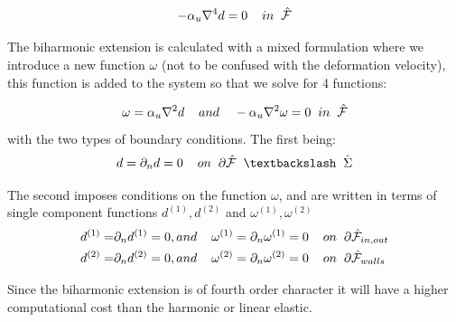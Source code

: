 \begin{equation}
- \alpha_u \nabla^4 d = 0 \hspace{4mm}  in \hspace{2mm} \hat{\mathcal{F}}\\
\end{equation}

The biharmonic extension is calculated with a mixed formulation where we introduce a new function $\omega$ (not to be confused with the deformation velocity), this function is added to the system so that we solve for 4 functions:

\begin{equation}
\omega = \alpha_u \nabla^2 d \hspace{4mm} and \hspace{4mm} - \alpha_u \nabla^2 \omega = 0 \hspace{2mm}   in \hspace{2mm} \hat{\mathcal{F}}
\end{equation}
with the two types of boundary conditions. The first being:
\begin{equation}
d = \partial_n d = 0 \hspace{4mm} on \hspace{2mm} \partial \hat{\mathcal{F}} \hspace{2mm} \textbackslash \hspace{2mm} \hat{\Sigma}
\end{equation}

The second imposes conditions on the function $\omega$, and are written in terms of single component functions $d^{(1)},d^{(2)}$ and $\omega^{(1)}, \omega^{(2)}$	
\begin{align}
d^{(1)} =& \partial_n d^{(1)} = 0 , and \hspace{4mm}   \omega^{(1)} = \partial_n \omega^{(1)} = 0    \hspace{4mm} on \hspace{2mm} \partial \hat{\mathcal{F}}_{in,out} \\
d^{(2)} =& \partial_n d^{(2)} = 0 , and \hspace{4mm}   \omega^{(2)} = \partial_n \omega^{(2)} = 0    \hspace{4mm} on \hspace{2mm} \partial \hat{\mathcal{F}}_{walls} \\
\end{align}

Since the biharmonic extension is of fourth order character it will have a higher computational cost \cite{Richter2016} than the harmonic or linear elastic. 



